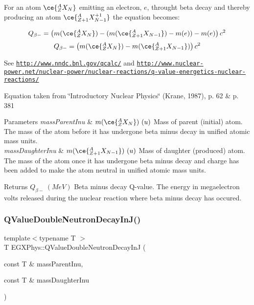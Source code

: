 For an atom $\ce{ ^{A}_{Z}X_{N} }$ emitting an electron, $e$, throught beta decay and thereby producing an atom $\ce{ ^{A}_{Z{+1}}X^{+1}_{N-1} }$ the equation becomes\+:

\[Q_{\beta-} = \left ( m(\ce{ ^{A}_{Z}X_{N} }) - (m(\ce{ ^{A}_{Z{+1}}X_{N-1} }) - m(e)) - m(e)\right ) c^2\] \[Q_{\beta-} = \left ( m(\ce{ ^{A}_{Z}X_{N} }) - m(\ce{ ^{A}_{Z{+1}}X_{N-1} })\right ) c^2\]

See \href{http://www.nndc.bnl.gov/qcalc/}{\tt http\+://www.\+nndc.\+bnl.\+gov/qcalc/} and \href{http://www.nuclear-power.net/nuclear-power/nuclear-reactions/q-value-energetics-nuclear-reactions/}{\tt http\+://www.\+nuclear-\/power.\+net/nuclear-\/power/nuclear-\/reactions/q-\/value-\/energetics-\/nuclear-\/reactions/}

Equation taken from \char`\"{}\+Introductory Nuclear Physics\char`\"{} (Krane, 1987), p. 62 \& p. 381


\begin{DoxyParams}{Parameters}
{\em mass\+Parent\+Inu} & $m(\ce{ ^{A}_{Z}X_{N} })\ (u)$ Mass of parent (initial) atom. The mass of the atom before it has undergone beta minus decay in unified atomic mass units. \\
\hline
{\em mass\+Daughter\+Inu} & $m(\ce{ ^{A}_{Z{+1}}X_{N-1} })\ (u)$ Mass of daughter (produced) atom. The mass of the atom once it has undergone beta minus decay and charge has been added to make the atom neutral in unified atomic mass units. \\
\hline
\end{DoxyParams}
\begin{DoxyReturn}{Returns}
$Q_{\beta-}\ (MeV)$ Beta minus decay Q-\/value. The energy in megaelectron volts released during the nuclear reaction where beta minus decay has occured. 
\end{DoxyReturn}
\mbox{\label{group___q_value_gada1ace2aa0a791df382f120767a56fe9}} 
\subsubsection{\texorpdfstring{Q\+Value\+Double\+Neutron\+Decay\+In\+J()}{QValueDoubleNeutronDecayInJ()}}
{\footnotesize\ttfamily template$<$typename T $>$ \\
T E\+G\+X\+Phys\+::\+Q\+Value\+Double\+Neutron\+Decay\+InJ (\begin{DoxyParamCaption}\item[{const T \&}]{mass\+Parent\+Inu,  }\item[{const T \&}]{mass\+Daughter\+Inu }\end{DoxyParamCaption})}



